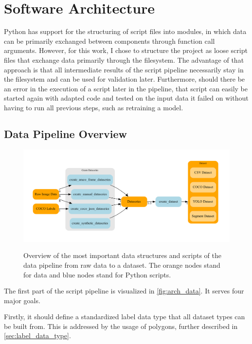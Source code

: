 \documentclass[10pt]{book}
\newcommand{\figureref}[1]{\autoref{#1}}
\begin{document}
\section{Software Architecture}

Python has support for the structuring of script files into modules, in which data can be primarily exchanged between components through function call arguments. However, for this work, I chose to structure the project as loose script files that exchange data primarily through the filesystem. The advantage of that approach is that all intermediate results of the script pipeline necessarily stay in the filesystem and can be used for validation later. Furthermore, should there be an error in the execution of a script later in the pipeline, that script can easily be started again with adapted code and tested on the input data it failed on without having to run all previous steps, such as retraining a model.

\subsection{Data Pipeline Overview}

\begin{figure}
  \caption{Overview of the most important data structures and scripts of the data pipeline from raw data to a dataset. The orange nodes stand for data and blue nodes stand for Python scripts.}
  \includegraphics[width=\textwidth]{graph/arch_data}
  \label{fig:arch_data}
\end{figure}

The first part of the script pipeline is visualized in \figureref{fig:arch_data}. It serves four major goals. 

Firstly, it should define a standardized label data type that all dataset types can be built from. This is addressed by the usage of polygons, further described in \autoref{sec:label_data_type}.
\end{document}
